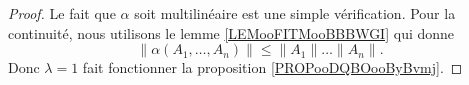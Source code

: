 \begin{proof}
	Le fait que \( \alpha\) soit multilinéaire est une simple vérification. Pour la continuité, nous utilisons le lemme \ref{LEMooFITMooBBBWGI} qui donne
	\begin{equation}
		\| \alpha(A_1,\ldots,A_n) \|\leq \| A_1 \|\ldots \| A_n \|.
	\end{equation}
	Donc \( \lambda=1\) fait fonctionner la proposition \ref{PROPooDQBOooByBvmj}.
\end{proof}
